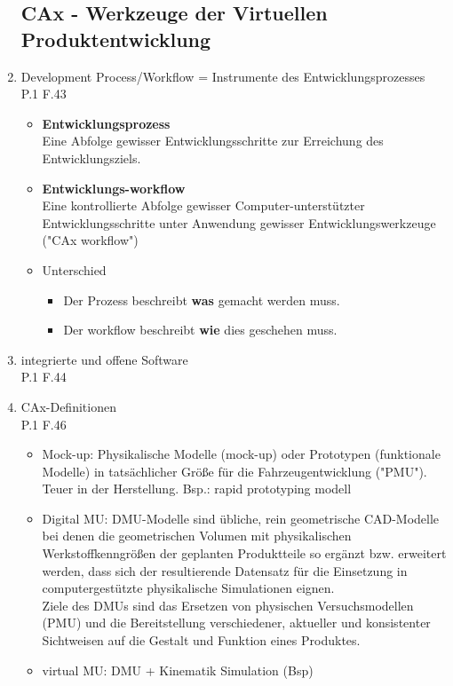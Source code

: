 \documentclass[10pt,a4paper,fleqn]{article}
\begin{document}
\begin{enumerate}
\subsection{CAx - Werkzeuge der Virtuellen Produktentwicklung}
\item Development Process/Workflow = Instrumente des Entwicklungsprozesses\\
	P.1 F.43
	\begin{itemize}
		\item \textbf{Entwicklungsprozess}\\
			Eine Abfolge gewisser Entwicklungsschritte zur Erreichung des Entwicklungsziels.
		\item \textbf{Entwicklungs-workflow}\\
			Eine kontrollierte Abfolge gewisser Computer-unterstützter Entwicklungsschritte unter Anwendung gewisser Entwicklungswerkzeuge ("CAx workflow")
		\item Unterschied
			\begin{itemize}
				\item Der Prozess beschreibt \textbf{was} gemacht werden muss.
				\item Der workflow beschreibt \textbf{wie} dies geschehen muss.
			\end{itemize}
	\end{itemize}
\item integrierte und offene Software\\
	P.1 F.44
\item CAx-Definitionen\\
	P.1 F.46
	\begin{itemize}
		\item Mock-up: Physikalische Modelle (mock-up) oder Prototypen (funktionale Modelle) in tatsächlicher Größe für die Fahrzeugentwicklung ("PMU"). Teuer in der Herstellung. Bsp.: rapid prototyping modell
		\item Digital MU: DMU-Modelle sind übliche, rein geometrische CAD-Modelle bei denen die geometrischen Volumen mit physikalischen Werkstoffkenngrößen der geplanten Produktteile so ergänzt bzw. erweitert werden, dass sich der resultierende Datensatz für die Einsetzung in computergestützte physikalische Simulationen eignen.\\
			Ziele des DMUs sind das Ersetzen von physischen Versuchsmodellen (PMU) und die Bereitstellung verschiedener, aktueller und konsistenter Sichtweisen auf die Gestalt und Funktion eines Produktes.
		\item virtual MU: DMU + Kinematik Simulation (Bsp)

\end{itemize}
\end{enumerate}
\end{document}
